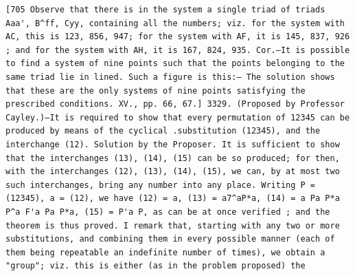 \documentclass[12pt]{article}
\theoremstyle{plain}
\begin{document}
\newpage
\setcounter{page}{574}
\begin{verbatim}
[705 Observe that there is in the system a single triad of triads Aaa', B^ff, Cyy, containing all the numbers; viz. for the system with AC, this is 123, 856, 947; for the system with AF, it is 145, 837, 926 ; and for the system with AH, it is 167, 824, 935. Cor.—It is possible to find a system of nine points such that the points belonging to the same triad lie in lined. Such a figure is this:— The solution shows that these are the only systems of nine points satisfying the prescribed conditions. XV., pp. 66, 67.] 3329. (Proposed by Professor Cayley.)—It is required to show that every permutation of 12345 can be produced by means of the cyclical .substitution (12345), and the interchange (12). Solution by the Proposer. It is sufficient to show that the interchanges (13), (14), (15) can be so produced; for then, with the interchanges (12), (13), (14), (15), we can, by at most two such interchanges, bring any number into any place. Writing P = (12345), a = (12), we have (12) = a, (13) = a7^aP*a, (14) = a Pa P*a P^a F'a Pa P*a, (15) = P'a P, as can be at once verified ; and the theorem is thus proved. I remark that, starting with any two or more substitutions, and combining them in every possible manner (each of them being repeatable an indefinite number of times), we obtain a "group"; viz. this is either (as in the problem proposed) the 
\end{verbatim}
\end{document}

